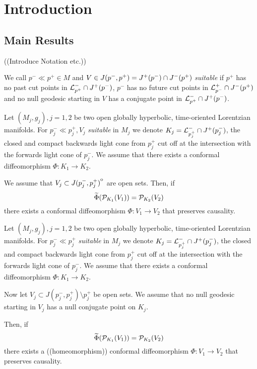 \chapter{Introduction}

\section{Main Results}
((Introduce Notation etc.))

\begin{definition}[Suitable]
    We call $p^-\ll p^+\in M$ and $V\in J(p^-,p^+) = J^+(p^-)\cap J^-(p^+)$ \emph{suitable} if $p^+$ has no past cut points in ${\mathcal{L}}^-_{p^+}\cap J^+(p^-)$,  $p^-$ has no future cut points in ${\mathcal{L}}^+_{p^-}\cap J^-(p^+)$ and no null geodesic starting in $V$ has a conjugate point in ${\mathcal{L}}^-_{p^+}\cap J^+(p^-)$.
\end{definition}

\begin{theorem}\label{thm:intreconstr}
    Let $(M_j,g_j), j=1,2$ be two open globally hyperbolic, time-oriented Lorentzian manifolds. For $p_j^-\ll p_j^+, V_j$ \emph{suitable} in $M_j$ we denote $K_j = {\mathcal{L}}^-_{p_j^+} \cap J^+(p_j^-)$, the closed and compact backwards light cone from $p_j^+$ cut off at the intersection with the forwards light cone of $p_j^-$. We assume that there exists a conformal diffeomorphism $\Phi:K_1\to K_2$. 
    
    We assume that $V_j\subset{\kern0ptJ(p_j^-,p_j^+)}^{\mathrm{o}}$ are open sets. 
    Then, if 
    \[
    \widetilde{\Phi}({\mathcal{P}}_{K_1}(V_1)) = {\mathcal{P}}_{K_2}(V_2)
    \]
    there exists a conformal diffeomorphism $\Phi:V_1\to V_2$ that preserves causality.
\end{theorem}


\begin{theorem}\label{thm:bdreconstr}
    Let $(M_j,g_j), j=1,2$ be two open globally hyperbolic, time-oriented Lorentzian manifolds. For $p_j^-\ll p_j^+$ \emph{suitable} in $M_j$ we denote $K_j = {\mathcal{L}}^-_{p_j^+} \cap J^+(p_j^-)$, the closed and compact backwards light cone from $p_j^+$ cut off at the intersection with the forwards light cone of $p_j^-$. We assume that there exists a conformal diffeomorphism $\Phi:K_1\to K_2$. 
    
    Now let $V_j\subset J(p_j^-,p_j^+) \setminus p_j^+$ be open sets. We assume that no null geodesic starting in $V_j$ has a null conjugate point on $K_j$. 
    
    Then, if 
    \[
    \widetilde{\Phi}({\mathcal{P}}_{K_1}(V_1)) = {\mathcal{P}}_{K_2}(V_2)
    \]
    there exists a ((homeomorphism)) conformal diffeomorphism $\Phi:V_1\to V_2$ that preserves causality.
\end{theorem}